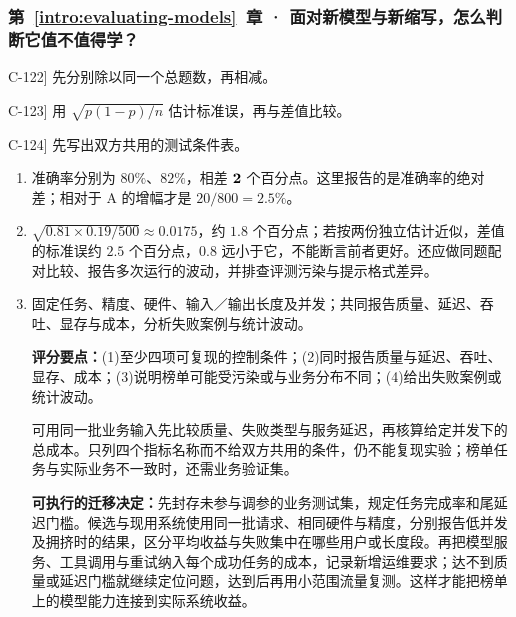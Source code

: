 \subsubsection*{第~\ref*{intro:evaluating-models}~章 · 面对新模型与新缩写，怎么判断它值不值得学？}
\begin{answerhints}
\item[\hyperref[exercise:metric-percentage-points]{C-122}] \leavevmode{}\label{hint:metric-percentage-points}先分别除以同一个总题数，再相减。
\item[\hyperref[exercise:benchmark-count-gap]{C-123}] \leavevmode{}\label{hint:benchmark-count-gap}用 $\sqrt{p(1-p)/n}$ 估计标准误，再与差值比较。
\item[\hyperref[exercise:production-architecture-evaluation]{C-124}] \leavevmode{}\label{hint:production-architecture-evaluation}先写出双方共用的测试条件表。
\end{answerhints}
\begin{enumerate}[label={},leftmargin=4.8em,itemsep=4pt]
\item[\textbf{\hyperref[exercise:metric-percentage-points]{C-122.}}] \leavevmode{}\label{solution:C-122}\label{solution:metric-percentage-points}准确率分别为 $80\%$、$82\%$，相差 $\boldsymbol{2}$ 个百分点。这里报告的是准确率的绝对差；相对于 A 的增幅才是 $20/800=2.5\%$。
\item[\textbf{\hyperref[exercise:benchmark-count-gap]{C-123.}}] \leavevmode{}\label{solution:C-123}\label{solution:benchmark-count-gap}$\sqrt{0.81\times0.19/500}\approx0.0175$，约 $1.8$ 个百分点；若按两份独立估计近似，差值的标准误约 $2.5$ 个百分点，$0.8$ 远小于它，不能断言前者更好。还应做同题配对比较、报告多次运行的波动，并排查评测污染与提示格式差异。
\item[\textbf{\hyperref[exercise:production-architecture-evaluation]{C-124.}}] \leavevmode{}\label{solution:C-124}\label{solution:production-architecture-evaluation}固定任务、精度、硬件、输入／输出长度及并发；共同报告质量、延迟、吞吐、显存与成本，分析失败案例与统计波动。\par\textbf{评分要点：}(1)至少四项可复现的控制条件；(2)同时报告质量与延迟、吞吐、显存、成本；(3)说明榜单可能受污染或与业务分布不同；(4)给出失败案例或统计波动。\par 可用同一批业务输入先比较质量、失败类型与服务延迟，再核算给定并发下的总成本。只列四个指标名称而不给双方共用的条件，仍不能复现实验；榜单任务与实际业务不一致时，还需业务验证集。\par\textbf{可执行的迁移决定：}先封存未参与调参的业务测试集，规定任务完成率和尾延迟门槛。候选与现用系统使用同一批请求、相同硬件与精度，分别报告低并发及拥挤时的结果，区分平均收益与失败集中在哪些用户或长度段。再把模型服务、工具调用与重试纳入每个成功任务的成本，记录新增运维要求；达不到质量或延迟门槛就继续定位问题，达到后再用小范围流量复测。这样才能把榜单上的模型能力连接到实际系统收益。
\end{enumerate}

